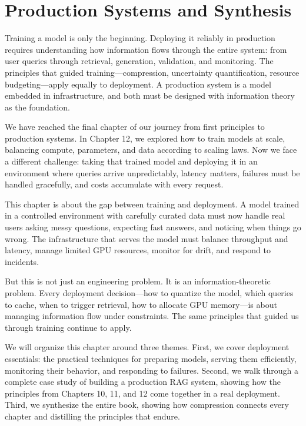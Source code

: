 
\chapter{Production Systems and Synthesis}

\begin{keyinsight}
Training a model is only the beginning. Deploying it reliably in production requires understanding how information flows through the entire system: from user queries through retrieval, generation, validation, and monitoring. The principles that guided training---compression, uncertainty quantification, resource budgeting---apply equally to deployment. A production system is a model embedded in infrastructure, and both must be designed with information theory as the foundation.
\end{keyinsight}

\vspace{1.5em}

We have reached the final chapter of our journey from first principles to production systems. In Chapter 12, we explored how to train models at scale, balancing compute, parameters, and data according to scaling laws. Now we face a different challenge: taking that trained model and deploying it in an environment where queries arrive unpredictably, latency matters, failures must be handled gracefully, and costs accumulate with every request.

This chapter is about the gap between training and deployment. A model trained in a controlled environment with carefully curated data must now handle real users asking messy questions, expecting fast answers, and noticing when things go wrong. The infrastructure that serves the model must balance throughput and latency, manage limited GPU resources, monitor for drift, and respond to incidents.

But this is not just an engineering problem. It is an information-theoretic problem. Every deployment decision---how to quantize the model, which queries to cache, when to trigger retrieval, how to allocate GPU memory---is about managing information flow under constraints. The same principles that guided us through training continue to apply.

We will organize this chapter around three themes. First, we cover deployment essentials: the practical techniques for preparing models, serving them efficiently, monitoring their behavior, and responding to failures. Second, we walk through a complete case study of building a production RAG system, showing how the principles from Chapters 10, 11, and 12 come together in a real deployment. Third, we synthesize the entire book, showing how compression connects every chapter and distilling the principles that endure.

